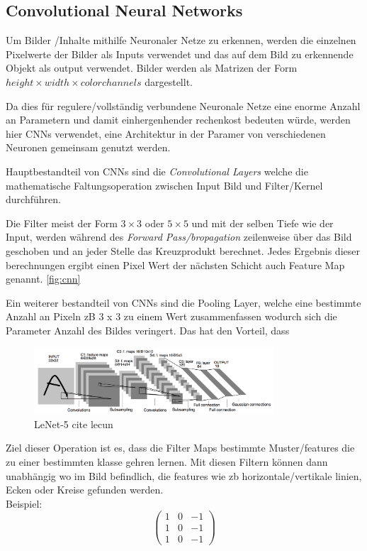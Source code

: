 \subsection{Convolutional Neural Networks}

Um Bilder /Inhalte mithilfe Neuronaler Netze zu erkennen, 
werden die einzelnen Pixelwerte der Bilder als Inputs verwendet 
und das auf dem Bild zu erkennende Objekt als output verwendet. Bilder 
werden als Matrizen der Form $height\times width \times color channels$ 
dargestellt.

Da dies für regulere/vollständig verbundene Neuronale Netze eine 
enorme Anzahl an Parametern und damit einhergenhender rechenkost 
bedeuten würde, werden hier CNNs verwendet, eine Architektur in 
der Paramer von verschiedenen Neuronen gemeinsam genutzt werden.

Hauptbestandteil von CNNs sind die \textit{Convolutional Layers}
welche die mathematische Faltungsoperation zwischen Input Bild 
und Filter/Kernel durchführen.

Die Filter meist der Form $3 \times 3$ oder $5 \times 5$ und mit der 
selben Tiefe wie der Input, werden während des \textit{Forward 
Pass/bropagation} zeilenweise über das Bild geschoben und an jeder Stelle 
das Kreuzprodukt berechnet. Jedes Ergebnis dieser berechnungen ergibt einen
Pixel Wert der nächsten Schicht auch Feature Map genannt. \ref{fig:cnn}

Ein weiterer bestandteil von CNNs sind die Pooling Layer, welche eine 
bestimmte Anzahl an Pixeln zB 3 x 3 zu einem Wert zusammenfassen wodurch 
sich die Parameter Anzahl des Bildes veringert. Das hat den Vorteil, dass 


\begin{figure}[htb]
    \centering
    \label{fig:lenet}
    \includegraphics[width=0.8\textwidth]{Bilder/lenet.png}
    \caption{LeNet-5 cite lecun}
\end{figure}



Ziel dieser Operation ist es, dass die 
Filter Maps bestimmte Muster/features die zu einer bestimmten klasse 
gehren lernen. Mit diesen Filtern können dann unabhängig wo im Bild 
befindlich, die features wie zb horizontale/vertikale linien, Ecken 
oder Kreise gefunden werden. 
\\
Beispiel:
\begin{equation}
    \begin{pmatrix}
        1 & 0 & -1\\
        1 & 0 & -1\\
        1 & 0 & -1
    \end{pmatrix}
\end{equation}

